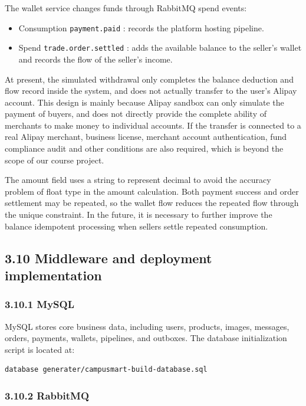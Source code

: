 \documentclass{article}
\begin{document}
The wallet service changes funds through RabbitMQ spend events:

\begin{itemize}
    \item Consumption \texttt{payment.paid} : records the platform hosting pipeline.
    \item Spend \texttt{trade.order.settled} : adds the available balance to the seller's wallet and records the flow of the seller's income.
\end{itemize}

At present, the simulated withdrawal only completes the balance deduction and flow record inside the system, and does not actually transfer to the user's Alipay account. This design is mainly because Alipay sandbox can only simulate the payment of buyers, and does not directly provide the complete ability of merchants to make money to individual accounts. If the transfer is connected to a real Alipay merchant, business license, merchant account authentication, fund compliance audit and other conditions are also required, which is beyond the scope of our course project.

The amount field uses a string to represent decimal to avoid the accuracy problem of float type in the amount calculation. Both payment success and order settlement may be repeated, so the wallet flow reduces the repeated flow through the unique constraint. In the future, it is necessary to further improve the balance idempotent processing when sellers settle repeated consumption.

\subsection{3.10 Middleware and deployment implementation}

\subsubsection{3.10.1 MySQL}

MySQL stores core business data, including users, products, images, messages, orders, payments, wallets, pipelines, and outboxes. The database initialization script is located at:

\begin{verbatim}
database generater/campusmart-build-database.sql
\end{verbatim}

\subsubsection{3.10.2 RabbitMQ}
\end{document}
